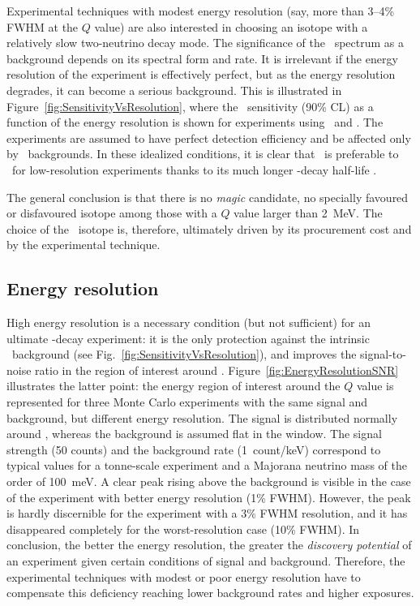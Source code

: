 \documentclass{PoS}
\begin{document}
Experimental techniques with modest energy resolution (say, more than 3--4\% FWHM at the $Q$ value) are also interested in choosing an isotope with a relatively slow two-neutrino decay mode. The significance of the \bbtnu\ spectrum as a background depends on its spectral form and rate. It is irrelevant if the energy resolution of the experiment is effectively perfect, but as the energy resolution degrades, it can become a serious background. This is illustrated in Figure~\ref{fig:SensitivityVsResolution}, where the \mbb\ sensitivity (90\% CL) as a function of the energy resolution is shown for experiments using \XE\ and \SE. The experiments are assumed to have perfect detection efficiency and be affected only by \bbtnu\ backgrounds. In these idealized conditions, it is clear that \XE\ is preferable to \SE\ for low-resolution experiments thanks to its much longer \bbtnu-decay half-life \cite{Barabash:2015eza}.

The general conclusion is that there is no \emph{magic} candidate, no specially favoured or disfavoured isotope among those with a $Q$ value larger than 2~MeV. The choice of the \bb\ isotope is, therefore, ultimately driven by its procurement cost  and by the experimental technique.

\subsection{Energy resolution} \label{subsec:EnergyResolution}
High energy resolution is a necessary condition (but not sufficient) for an ultimate \bbonu-decay experiment: it is the only protection against the intrinsic \bbtnu\ background (see Fig.~\ref{fig:SensitivityVsResolution}), and improves the signal-to-noise ratio in the region of interest around \Qbb. Figure~\ref{fig:EnergyResolutionSNR} illustrates the latter point: the energy region of interest around the $Q$ value is represented for three Monte Carlo experiments with the same signal and background, but different energy resolution. The signal is distributed normally around \Qbb, whereas the background is assumed flat in the window. The signal strength (50 counts) and the background rate (1~count/keV) correspond to typical values for a tonne-scale experiment and a Majorana neutrino mass of the order of 100~meV. A clear peak rising above the background is visible in the case of the experiment with better energy resolution (1\% FWHM). However, the peak is hardly discernible for the experiment with a 3\% FWHM resolution, and it has disappeared completely for the worst-resolution case (10\% FWHM). In conclusion, the better the energy resolution, the greater the \emph{discovery potential} of an experiment given certain conditions of signal and background. Therefore, the experimental techniques with modest or poor energy resolution have to compensate this deficiency reaching lower background rates and higher exposures.
\end{document}
